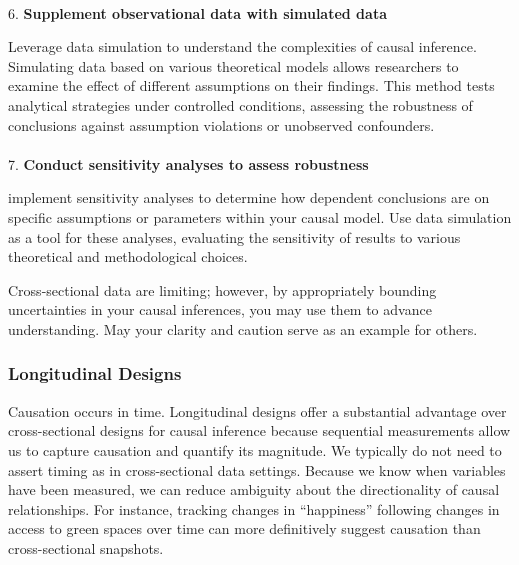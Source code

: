 \documentclass[
  single column]{article}
\makeatletter
\let\oldparagraph\paragraph
\renewcommand{\paragraph}{
    \@ifstar
      \xxxParagraphStar
      \xxxParagraphNoStar
  }
\newcommand{\xxxParagraphStar}[1]{\oldparagraph*{#1}\mbox{}}
\newcommand{\xxxParagraphNoStar}[1]{\oldparagraph{#1}\mbox{}}
\makeatother
\begin{document}
\paragraph{\texorpdfstring{6. \textbf{Supplement observational data with
simulated
data}}{6. Supplement observational data with simulated data}}\label{supplement-observational-data-with-simulated-data}

Leverage data simulation to understand the complexities of causal
inference. Simulating data based on various theoretical models allows
researchers to examine the effect of different assumptions on their
findings. This method tests analytical strategies under controlled
conditions, assessing the robustness of conclusions against assumption
violations or unobserved confounders.

\paragraph{\texorpdfstring{7. \textbf{Conduct sensitivity analyses to
assess
robustness}}{7. Conduct sensitivity analyses to assess robustness}}\label{conduct-sensitivity-analyses-to-assess-robustness}

implement sensitivity analyses to determine how dependent conclusions
are on specific assumptions or parameters within your causal model. Use
data simulation as a tool for these analyses, evaluating the sensitivity
of results to various theoretical and methodological choices.

Cross-sectional data are limiting; however, by appropriately bounding
uncertainties in your causal inferences, you may use them to advance
understanding. May your clarity and caution serve as an example for
others.

\subsubsection{Longitudinal Designs}\label{longitudinal-designs}

Causation occurs in time. Longitudinal designs offer a substantial
advantage over cross-sectional designs for causal inference because
sequential measurements allow us to capture causation and quantify its
magnitude. We typically do not need to assert timing as in
cross-sectional data settings. Because we know when variables have been
measured, we can reduce ambiguity about the directionality of causal
relationships. For instance, tracking changes in ``happiness'' following
changes in access to green spaces over time can more definitively
suggest causation than cross-sectional snapshots.
\end{document}
